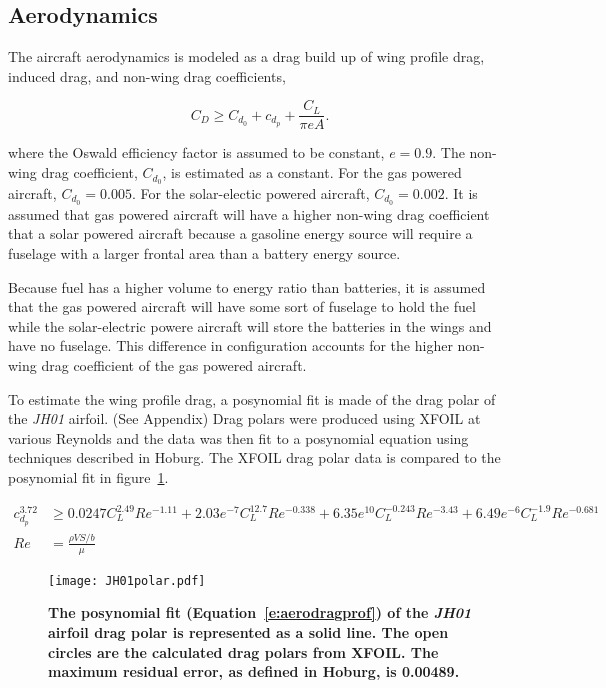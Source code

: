 \documentclass[]{aiaa-tc}%
\begin{document}
\subsection{Aerodynamics}

The aircraft aerodynamics is modeled as a drag build up of wing profile drag, induced drag, and non-wing drag coefficients, 

\begin{equation}
    \label{e:aerodragb}
    C_D \geq C_{d_0} + c_{d_p} + \frac{C_L}{\pi e A}.
    \end{equation}

where the Oswald efficiency factor is assumed to be constant, $e=0.9$. 
The non-wing drag coefficient, $C_{d_0}$, is estimated as a constant.  
For the gas powered aircraft, $C_{d_0} = 0.005$.  
For the solar-electic powered aircraft, $C_{d_0} = 0.002$.  
It is assumed that gas powered aircraft will have a higher non-wing drag coefficient that a solar powered aircraft because a gasoline energy source will require a fuselage with a larger frontal area than a battery energy source.\cite{raymer}
    
    Because fuel has a higher volume to energy ratio than batteries, it is assumed that the gas powered aircraft will have some sort of fuselage to hold the fuel while the solar-electric powere aircraft will store the batteries in the wings and have no fuselage.  This difference in configuration accounts for the higher non-wing drag coefficient of the gas powered aircraft.  
    
    To estimate the wing profile drag, a posynomial fit is made of the drag polar of the \emph{JH01} airfoil. (See Appendix) 
    Drag polars were produced using XFOIL at various Reynolds and the data was then fit to a posynomial equation using techniques described in Hoburg.\cite{fitting}
    The XFOIL drag polar data is compared to the posynomial fit in figure~\ref{f:JH01polar}.

    \begin{align}
        \label{e:aerodragprof}
        c_{d_p}^{3.72} &\geq  0.0247C_L^{2.49}Re^{-1.11} + 2.03e^{-7}C_L^{12.7}Re^{-0.338} + 6.35e^{10}C_L^{-0.243}Re^{-3.43} + 6.49e^{-6}C_L^{-1.9}Re^{-0.681}\\
        Re &= \frac{\rho V S/b}{\mu}
    \end{align}

\begin{figure}[H]
	\begin{center}
	\texttt{[image: JH01polar.pdf]}
    \caption{ \textbf{ The posynomial fit (Equation~\ref{e:aerodragprof}) of the \emph{JH01} airfoil drag polar is represented as a solid line.  The open circles are the calculated drag polars from XFOIL. The maximum residual error, as defined in Hoburg\cite{fitting}, is 0.00489.} }
	\label{f:JH01polar}
	\end{center}
\end{figure}
\end{document}
